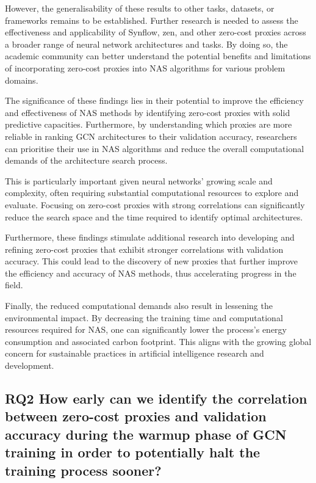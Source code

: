However, the generalisability of these results to other tasks, datasets, or frameworks remains to be established. Further research is needed to assess the effectiveness and applicability of \gls{Synflow}, zen, and other zero-cost proxies across a broader range of neural network architectures and tasks. By doing so, the academic community can better understand the potential benefits and limitations of incorporating zero-cost proxies into \gls{NAS} algorithms for various problem domains.  

The significance of these findings lies in their potential to improve the efficiency and effectiveness of \gls{NAS} methods by identifying zero-cost proxies with solid predictive capacities. Furthermore, by understanding which proxies are more reliable in ranking \gls{GCN} architectures to their validation accuracy, researchers can prioritise their use in \gls{NAS} algorithms and reduce the overall computational demands of the architecture search process.

This is particularly important given neural networks' growing scale and complexity, often requiring substantial computational resources to explore and evaluate. Focusing on zero-cost proxies with strong correlations can significantly reduce the search space and the time required to identify optimal architectures.

Furthermore, these findings stimulate additional research into developing and refining zero-cost proxies that exhibit stronger correlations with validation accuracy. This could lead to the discovery of new proxies that further improve the efficiency and accuracy of \gls{NAS} methods, thus accelerating progress in the field.

Finally, the reduced computational demands also result in lessening the environmental impact. By decreasing the training time and computational resources required for \gls{NAS}, one can significantly lower the process's energy consumption and associated carbon footprint. This aligns with the growing global concern for sustainable practices in artificial intelligence research and development.


\subsection{RQ2 How early can we identify the correlation between zero-cost proxies and validation accuracy during the warmup phase of GCN training in order to potentially halt the training process sooner?}


